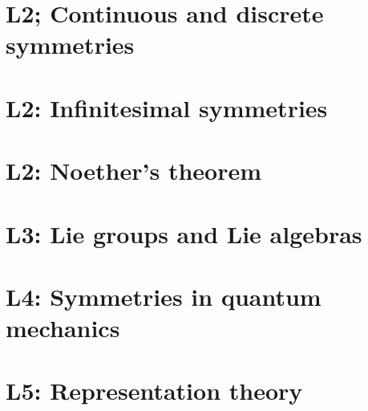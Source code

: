 \documentclass{book}
\theoremstyle{definition}
\begin{document}
\section{L2; Continuous and discrete symmetries}

\section{L2: Infinitesimal symmetries}

\section{L2: Noether's theorem}

\newpage

\section{L3: Lie groups and Lie algebras}

\newpage

\section{L4: Symmetries in quantum mechanics}

\newpage

\section{L5: Representation theory}













\newpage
\end{document}
